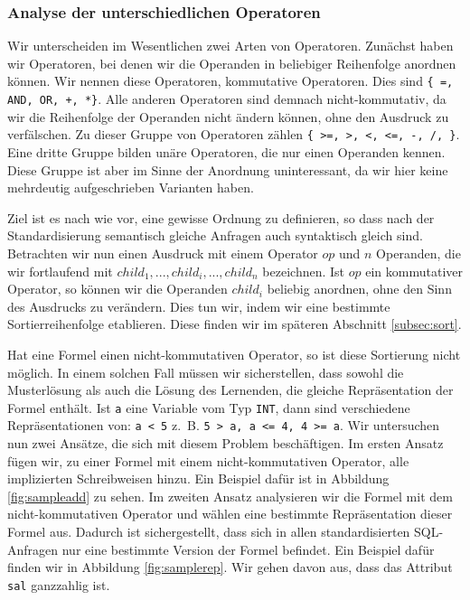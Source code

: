 \subsubsection{Analyse der unterschiedlichen Operatoren}

Wir unterscheiden im Wesentlichen zwei Arten von Operatoren. Zunächst haben wir Operatoren, bei denen wir die Operanden in beliebiger Reihenfolge anordnen können. Wir nennen diese Operatoren, kommutative Operatoren. Dies sind \verb|{ =, AND, OR, +, *}|. Alle anderen Operatoren sind demnach nicht-kommutativ, da wir die Reihenfolge der Operanden nicht ändern können, ohne den Ausdruck zu verfälschen. Zu dieser Gruppe von Operatoren zählen \verb|{ >=, >, <, <=, -, /, }|. Eine dritte Gruppe bilden unäre Operatoren, die nur einen Operanden kennen. Diese Gruppe ist aber im Sinne der Anordnung uninteressant, da wir hier keine mehrdeutig aufgeschrieben Varianten haben.

Ziel ist es nach wie vor, eine gewisse Ordnung zu definieren, so dass nach der Standardisierung semantisch gleiche Anfragen auch syntaktisch gleich sind. Betrachten wir nun einen Ausdruck mit einem Operator $op$ und $n$ Operanden, die wir fortlaufend mit $\mathit{child_1},...,\mathit{child_i},...,\mathit{child_n}$ bezeichnen. Ist $op$ ein kommutativer Operator, so können wir die Operanden $child_i$ beliebig anordnen, ohne den Sinn des Ausdrucks zu verändern. Dies tun wir, indem wir eine bestimmte Sortierreihenfolge etablieren. Diese finden wir im späteren Abschnitt \ref{subsec:sort}.

Hat eine Formel einen nicht-kommutativen Operator, so ist diese Sortierung nicht möglich. In einem solchen Fall müssen wir sicherstellen, dass sowohl die Musterlösung als auch die Lösung des Lernenden, die gleiche Repräsentation der Formel enthält. Ist \verb|a| eine Variable vom Typ \verb|INT|, dann sind verschiedene Repräsentationen von: \verb|a < 5| \mbox{z. B.} \verb|5 > a, a <= 4, 4 >= a|. Wir untersuchen nun zwei Ansätze, die sich mit diesem Problem beschäftigen. Im ersten Ansatz fügen wir, zu einer Formel mit einem nicht-kommutativen Operator, alle implizierten Schreibweisen hinzu. Ein Beispiel dafür ist in Abbildung \ref{fig:sampleadd} zu sehen. Im zweiten Ansatz analysieren wir die Formel mit dem nicht-kommutativen Operator und wählen eine bestimmte Repräsentation dieser Formel aus. Dadurch ist sichergestellt, dass sich in allen standardisierten SQL-Anfragen nur eine bestimmte Version der Formel befindet. Ein Beispiel dafür finden wir in Abbildung \ref{fig:samplerep}. Wir gehen davon aus, dass das Attribut \verb|sal| ganzzahlig ist.

